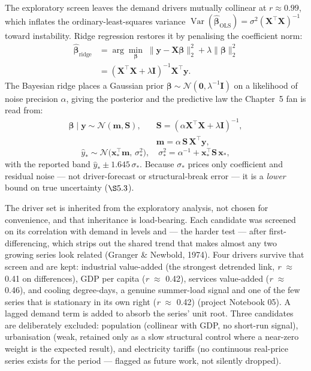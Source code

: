 \documentclass[10pt,twocolumn]{article}
\begin{document}
\noindent The exploratory screen leaves the demand drivers mutually collinear at
$r\approx0.99$, which inflates the ordinary-least-squares variance
$\operatorname{Var}(\hat{\boldsymbol\beta}_{\mathrm{OLS}})=\sigma^2(\mathbf{X}^\top\mathbf{X})^{-1}$
toward instability. Ridge regression restores it by penalising the coefficient
norm:
\begin{equation}
\begin{aligned}
\hat{\boldsymbol\beta}_{\mathrm{ridge}}
   &=\arg\min_{\boldsymbol\beta}\;
   \bigl\lVert\mathbf{y}-\mathbf{X}\boldsymbol\beta\bigr\rVert_2^{2}
   +\lambda\lVert\boldsymbol\beta\rVert_2^{2}\\
   &=(\mathbf{X}^\top\mathbf{X}+\lambda\mathbf{I})^{-1}\mathbf{X}^\top\mathbf{y}.
\end{aligned}
\label{eq:ridge}
\end{equation}
The Bayesian ridge places a Gaussian prior $\boldsymbol\beta\sim\mathcal{N}(\mathbf{0},\lambda^{-1}\mathbf{I})$
on a likelihood of noise precision $\alpha$, giving the posterior and the
predictive law the Chapter~5 fan is read from:
\begin{equation}
\begin{aligned}
\boldsymbol\beta\mid\mathbf{y}\sim\mathcal{N}(\mathbf{m},\mathbf{S}),\quad
&\mathbf{S}=(\alpha\mathbf{X}^\top\mathbf{X}+\lambda\mathbf{I})^{-1},\\
&\mathbf{m}=\alpha\,\mathbf{S}\,\mathbf{X}^\top\mathbf{y},
\end{aligned}
\label{eq:bridge}
\end{equation}
\begin{equation}
\hat y_\ast\sim\mathcal{N}\!\bigl(\mathbf{x}_\ast^\top\mathbf{m},\,\sigma_\ast^{2}\bigr),
\quad
\sigma_\ast^{2}=\alpha^{-1}+\mathbf{x}_\ast^\top\mathbf{S}\,\mathbf{x}_\ast,
\label{eq:pred}
\end{equation}
with the reported band $\hat y_\ast\pm1.645\,\sigma_\ast$. Because $\sigma_\ast$
prices only coefficient and residual noise --- not driver-forecast or
structural-break error --- it is a \emph{lower} bound on true uncertainty
($\S5.3$).

The driver set is inherited from the exploratory analysis, not chosen for convenience, and that inheritance is load-bearing. Each candidate was screened on its correlation with demand in levels and --- the harder test --- after first-differencing, which strips out the shared trend that makes almost any two growing series look related (Granger \& Newbold, 1974). Four drivers survive that screen and are kept: industrial value-added (the strongest detrended link, \textit{r} $\approx$ 0.41 on differences), GDP per capita (\textit{r} $\approx$ 0.42), services value-added (\textit{r} $\approx$ 0.46), and cooling degree-days, a genuine summer-load signal and one of the few series that is stationary in its own right (\textit{r} $\approx$ 0.42) (project Notebook 05). A lagged demand term is added to absorb the series' unit root. Three candidates are deliberately excluded: population (collinear with GDP, no short-run signal), urbanisation (weak, retained only as a slow structural control where a near-zero weight is the expected result), and electricity tariffs (no continuous real-price series exists for the period --- flagged as future work, not silently dropped).
\end{document}

